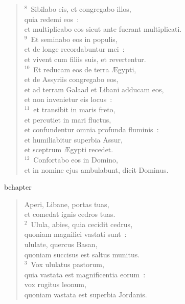 \begin{flushleft}
\begin{verse}
${}^{8}$~Sibilabo eis, et congregabo illos,\\ quia redemi eos~:\\ et multiplicabo eos sicut ante fuerant multiplicati.\\
${}^{9}$~Et seminabo eos in populis,\\ et de longe recordabuntur mei~:\\ et vivent cum filiis suis, et revertentur.\\
${}^{10}$~Et reducam eos de terra \AE gypti,\\ et de Assyriis congregabo eos,\\ et ad terram Galaad et Libani adducam eos,\\ et non invenietur eis locus~:\\
${}^{11}$~et transibit in maris freto,\\ et percutiet in mari fluctus,\\ et confundentur omnia profunda fluminis~:\\ et humiliabitur superbia Assur,\\ et sceptrum \AE gypti recedet.\\
${}^{12}$~Confortabo eos in Domino,\\ et in nomine ejus ambulabunt, dicit Dominus.\end{verse}\end{flushleft}


bchapter\begin{flushleft}\begin{verse}\vspace{-19pt}\hspace{6pt}Aperi, Libane, portas tuas,\\\hspace{6pt} et comedat ignis cedros tuas.\\
${}^{2}$~Ulula, abies, quia cecidit cedrus,\\ quoniam magnifici vastati sunt~:\\ ululate, quercus Basan,\\ quoniam succisus est saltus munitus.\\
${}^{3}$~Vox ululatus pastorum,\\ quia vastata est magnificentia eorum~:\\ vox rugitus leonum,\\ quoniam vastata est superbia Jordanis.\end{verse}\end{flushleft}


